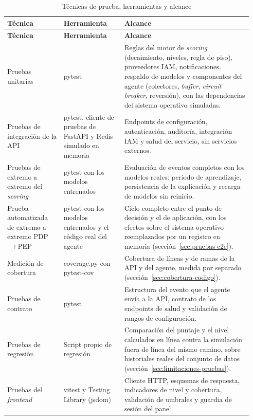 \begin{longtable}{>{\raggedright\arraybackslash}p{3.3cm}>{\raggedright\arraybackslash}p{4.2cm}>{\raggedright\arraybackslash}p{6.6cm}}
	\caption{Técnicas de prueba, herramientas y alcance}
	\label{tab:tecnicas-prueba}\\
	\hline
	\textbf{Técnica} & \textbf{Herramienta} & \textbf{Alcance} \\
	\hline
	\endfirsthead
	\hline
	\textbf{Técnica} & \textbf{Herramienta} & \textbf{Alcance} \\
	\hline
	\endhead
	Pruebas unitarias & pytest & Reglas del motor de \emph{scoring} (decaimiento, niveles, regla de piso), proveedores IAM, notificaciones, respaldo de modelos y componentes del agente (colectores, \emph{buffer}, \emph{circuit breaker}, reversión), con las dependencias del sistema operativo simuladas. \\
	\hline
	Pruebas de integración de la API & pytest, cliente de pruebas de FastAPI y Redis simulado en memoria & Endpoints de configuración, autenticación, auditoría, integración IAM y salud del servicio, sin servicios externos. \\
	\hline
	Pruebas de extremo a extremo del \emph{scoring} & pytest con los modelos entrenados & Evaluación de eventos completos con los modelos reales: período de aprendizaje, persistencia de la explicación y recarga de modelos sin reinicio. \\
	\hline
	Prueba automatizada de extremo a extremo PDP$\rightarrow$PEP & pytest con los modelos entrenados y el código real del agente & Ciclo completo entre el punto de decisión y el de aplicación, con los efectos sobre el sistema operativo reemplazados por un registro en memoria (sección~\ref{sec:pruebas-e2e}). \\
	\hline
	Medición de cobertura & coverage.py con pytest-cov & Cobertura de líneas y de ramas de la API y del agente, medida por separado (sección~\ref{sec:cobertura-codigo}). \\
	\hline
	Pruebas de contrato & pytest & Estructura del evento que el agente envía a la API, contrato de los endpoints de salud y validación de rangos de configuración. \\
	\hline
	Pruebas de regresión & Script propio de regresión & Comparación del puntaje y el nivel calculados en línea contra la simulación fuera de línea del mismo camino, sobre historiales reales del conjunto de datos (sección~\ref{sec:limitaciones-pruebas}). \\
	\hline
	Pruebas del \emph{frontend} & vitest y Testing Library (jsdom) & Cliente HTTP, esquemas de respuesta, indicadores de nivel y cobertura, validación de umbrales y guardia de sesión del panel. \\

\end{longtable}

